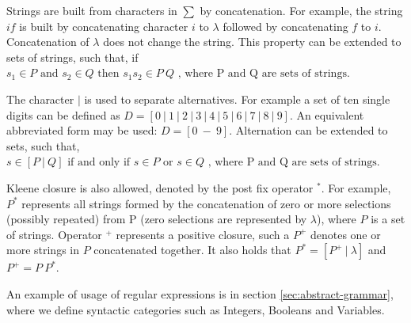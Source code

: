 \par
Strings are built from characters in $\sum$ by concatenation. For example, the string $\textit{if}$ is built by concatenating character $\textit{i}$ to $\lambda$ followed by concatenating $\textit{f}$ to $\textit{i}$. Concatenation of $\lambda$ does not change the string. This property can be extended to sets of strings, such that, if $s_1 \in P \text{ and } s_2 \in Q \text{ then } s_1 s_2 \in P \: Q \text{ , where P and Q are sets of strings}$. 

\par
The character $\textit{|}$ is used to separate alternatives. For example a set of ten single digits can be defined as $D = [0 \:| \: 1 \: | \: 2 \: | \: 3 \: | \: 4 \: | \: 5 \: | \: 6 \: | \: 7 \: | \: 8 \: | \: 9]$. An  equivalent abbreviated form may be used: $D = [0 \: - \: 9]$. Alternation can be extended to sets, such that, $s \in [P \: | \: Q] \text{ if and only if }s \in P \text{ or } s \in Q \text{ , where P and Q are sets of strings}$. \cite[p. 61]{craftingCompiler}    

\par 
Kleene closure is also allowed, denoted by the post fix operator $ ^* $. For example, $P^*$ represents all strings formed by the concatenation of zero or more selections (possibly repeated) from P (zero selections are represented by $\lambda$), where $P$ is a set of strings. Operator $^+$ represents a positive closure, such a $P^+$ denotes one or more strings in $P$ concatenated together. It also holds that $P^* = [P^+ \: | \: \lambda]$ and $P^+= P \: P^*$. \cite[p. 62]{craftingCompiler}

\par 
An example of usage of regular expressions is in section \cref{sec:abstract-grammar}, where we define syntactic categories such as Integers, Booleans and Variables.
